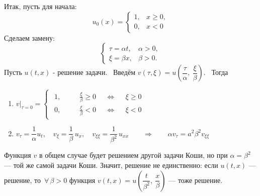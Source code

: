 \documentclass[../main.tex]{subfiles}
\begin{document}
Итак, пусть для начала:
\begin{equation*}
u_0(x) = \begin{cases} 
	1, &x \geq 0, \\
	0, &x < 0 
\end{cases} 
\end{equation*}
Сделаем замену: 
\begin{equation*}
\begin{cases}
	\tau = \alpha t, &\alpha > 0, \\
	\xi = \beta x, &\beta > 0.
\end{cases}
\end{equation*}
Пусть $u(t, x)$ - решение задачи. \ Введём $v(\tau, \xi) = u\left(\dfrac{\tau}{\alpha},\ \dfrac{\xi}{\beta}\right)$. \ Тогда
\begin{enumerate}
	\vspace{-0.7em} %
	\item \qquad $v\bigr|_{\tau=0} = \begin{cases} \begin{aligned}
		1, \quad && \frac{\xi}{\beta} \geq 0 &&\Leftrightarrow && \xi \geq 0 \\
		0, \quad && \frac{\xi}{\beta} < 0 && \Leftrightarrow && \xi < 0
	\end{aligned}\end{cases}$

	\item \qquad $v_\tau = \dfrac{1}{\alpha}u_t, \quad v_\xi = \dfrac{1}{\beta}\, u_x, \quad v_{\xi \xi} = \dfrac{1}{\beta^2}\, u_{xx} \qquad\Rightarrow\qquad \alpha v_{\tau} = a^2 \beta^2 v_{\xi \xi}$
\end{enumerate}

Функция $v$ в общем случае будет решением другой задачи Коши, но при $\alpha = \beta^2$ --- той же самой задачи Коши. Значит, решение не единственно: если $u(t,x)$ --- решение, то $\,\forall\, \beta > 0$ функция $v(t,x) = u\left(\dfrac{t}{\beta^2},\ \dfrac{x}{\beta}\right)$ --- тоже решение.
\end{document}

